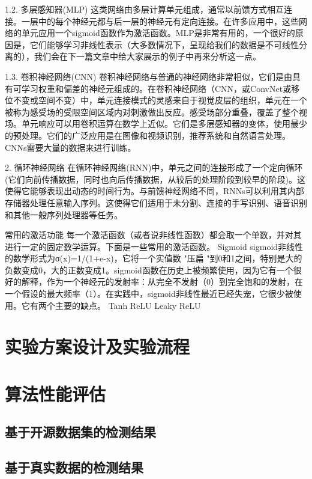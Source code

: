 1.2. 多层感知器(MLP)
这类网络由多层计算单元组成，通常以前馈方式相互连接。一层中的每个神经元都与后一层的神经元有定向连接。在许多应用中，这些网络的单元应用一个sigmoid函数作为激活函数。MLP是非常有用的，一个很好的原因是，它们能够学习非线性表示（大多数情况下，呈现给我们的数据是不可线性分离的），我们会在下一篇文章中给大家展示的例子中再来分析这一点。

1.3. 卷积神经网络(CNN)
卷积神经网络与普通的神经网络非常相似，它们是由具有可学习权重和偏差的神经元组成的。在卷积神经网络（CNN，或ConvNet或移位不变或空间不变）中，单元连接模式的灵感来自于视觉皮层的组织，单元在一个被称为感受场的受限空间区域内对刺激做出反应。感受场部分重叠，覆盖了整个视场。单元响应可以用卷积运算在数学上近似。它们是多层感知器的变体，使用最少的预处理。它们的广泛应用是在图像和视频识别，推荐系统和自然语言处理。CNNs需要大量的数据来进行训练。

2. 循环神经网络
在循环神经网络(RNN)中，单元之间的连接形成了一个定向循环(它们向前传播数据，同时也向后传播数据，从较后的处理阶段到较早的阶段)。这使得它能够表现出动态的时间行为。与前馈神经网络不同，RNNs可以利用其内部存储器处理任意输入序列。这使得它们适用于未分割、连接的手写识别、语音识别和其他一般序列处理器等任务。

常用的激活功能
每一个激活函数（或者说非线性函数）都会取一个单数，并对其进行一定的固定数学运算。下面是一些常用的激活函数。
Sigmoid
sigmoid非线性的数学形式为σ(x)=1/(1+e-x)，它将一个实值数 "压扁 "到0和1之间，特别是大的负数变成0，大的正数变成1。sigmoid函数在历史上被频繁使用，因为它有一个很好的解释，作为一个神经元的发射率：从完全不发射（0）到完全饱和的发射，在一个假设的最大频率（1）。在实践中，sigmoid非线性最近已经失宠，它很少被使用。它有两个主要的缺点。
Tanh
ReLU
Leaky ReLU

\section{实验方案设计及实验流程}


\section{算法性能评估}

\subsection{基于开源数据集的检测结果}

\subsection{基于真实数据的检测结果}